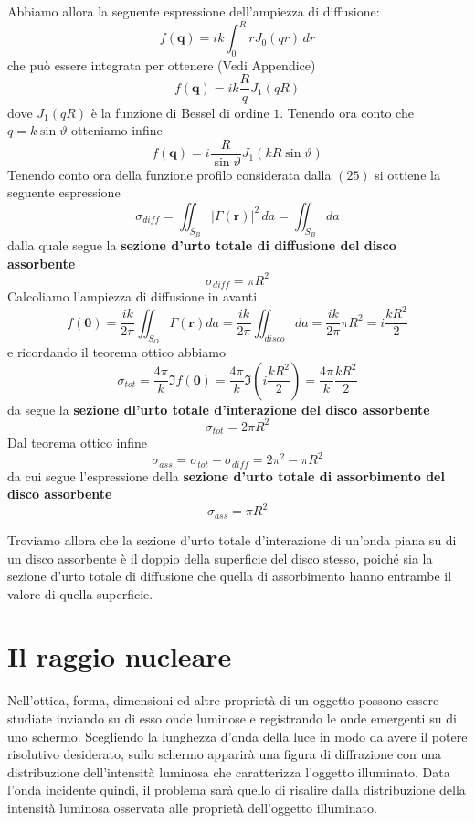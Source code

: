Abbiamo allora la seguente espressione dell'ampiezza di diffusione:
\[
	f(\bm{q}) = ik \int_0^R r J_0(qr) \, dr
\] che può essere integrata per ottenere (Vedi Appendice)
\[
	f(\bm{q}) = ik \frac{R}{q} J_1(qR)
\]
dove \(J_1(qR)\) è la funzione di Bessel di ordine \(1\).
Tenendo ora conto che \(q = k \sin \vartheta\) otteniamo infine
\begin{equation}
	f(\bm{q}) = i \frac{R}{\sin \vartheta} J_1(kR \sin \vartheta)
\end{equation}
Tenendo conto ora della funzione profilo considerata dalla \((25)\) si ottiene la seguente espressione
\[
	\sigma_{diff} = \iint_{S_B} |\Gamma(\bm{r})|^2 \, da = \iint_{S_B} da
\]
dalla quale segue la \textbf{sezione d'urto totale di diffusione del disco assorbente}
\begin{equation}
	\sigma_{diff} = \pi R^2
\end{equation}
Calcoliamo l'ampiezza di diffusione in avanti
\[
	f(\bm{0}) = \frac{ik}{2 \pi} \iint_{S_O} \Gamma (\bm{r}) da = \frac{ik}{2 \pi} \iint_{disco} da = \frac{ik}{2 \pi}
	\pi R^2 = i \frac{kR^2}{2}
\] e ricordando il teorema ottico abbiamo
\[
	\sigma_{tot} = \frac{4 \pi}{k} \Im f(\bm{0}) = \frac{4 \pi}{k} \Im \left(i  \frac{kR^2}{2}\right) = \frac{4 \pi}{k}\frac{kR^2}{2}
\]
da segue la \textbf{sezione dl'urto totale d'interazione del disco assorbente}
\begin{equation}
	\sigma_{tot} = 2 \pi R^2
\end{equation}
Dal teorema ottico infine
\[
	\sigma_{ass} = \sigma_{tot} - \sigma_{diff} = 2\pi ^2 - \pi R^2
\] da cui segue l'espressione della \textbf{sezione d'urto totale di
assorbimento del disco assorbente}
\begin{equation}
	\sigma_{ass} = \pi R^2
\end{equation}

Troviamo allora che la sezione d'urto totale d'interazione di un'onda
piana su di un disco assorbente è il doppio della superficie del disco
stesso, poiché sia la sezione d'urto totale di diffusione che quella di
assorbimento hanno entrambe il valore di quella superficie.
\section{Il raggio nucleare}\label{sec:raggio-nucleare}
Nell'ottica, forma, dimensioni ed altre proprietà di un oggetto possono
essere studiate inviando su di esso onde luminose e registrando le onde
emergenti su di uno schermo. Scegliendo la lunghezza d'onda della luce
in modo da avere il potere risolutivo desiderato, sullo schermo apparirà
una figura di diffrazione con una distribuzione dell'intensità luminosa
che caratterizza l'oggetto illuminato. Data l'onda incidente quindi, il
problema sarà quello di risalire dalla distribuzione della intensità
luminosa osservata alle proprietà dell'oggetto illuminato.

